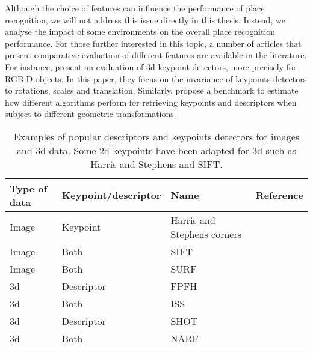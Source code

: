 Although the choice of features can influence the performance of place recognition, we will not address this issue directly in this thesis. Instead, we analyse the impact of some environments on the overall place recognition performance. For those further interested in this topic, a number of articles that present comparative evaluation of different features are available in the literature. For instance, \citet{Filipe2014} present an evaluation of \gls*{3d} keypoint detectors, more precisely for RGB-D objects. In this paper, they focus on the invariance of keypoints detectors to rotations, scales and translation. Similarly, \citet{Boyer2011} propose a benchmark to estimate how different algorithms perform for retrieving keypoints and descriptors when subject to different geometric transformations.

\begin{table}[H]
    \centering
    \begin{tabular}{@{}llll@{}}
        \toprule
        \textbf{Type of data}  & \textbf{Keypoint/descriptor} & \textbf{Name}               & \textbf{Reference} \\
        \hline
        Image                  & Keypoint                     & Harris and Stephens corners & \citep{Harris1988}  \\
        Image                  & Both                         & SIFT                        & \citep{Lowe2004}    \\
        Image                  & Both                         & SURF                        & \citep{Bay2006}     \\
        \gls*{3d}              & Descriptor                   & FPFH                        & \citep{Rusu2009}    \\
        \gls*{3d}              & Both                         & ISS                         & \citep{Yu2009}      \\
        \gls*{3d}              & Descriptor                   & SHOT                        & \citep{Tombari2010} \\
        \gls*{3d}              & Both                         & NARF                        & \citep{Steder2011a} \\
        \bottomrule
    \end{tabular}
    \caption[Examples of popular descriptors and keypoints detectors for images and \gls*{3d} data.]{Examples of popular descriptors and keypoints detectors for images and \gls*{3d} data. Some \gls*{2d} keypoints have been adapted for \gls*{3d} such as Harris and Stephens and SIFT.}
    \label{tab:features_examples}
\end{table}

